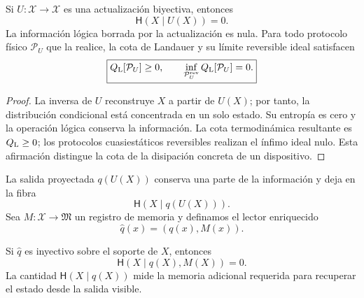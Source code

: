 \begin{theorem}
\label{thm:rm-obs-zero-landauer}
Si \(U:\mathcal X\to\mathcal X\) es una actualizaci\'on biyectiva, entonces
\begin{equation}
 \boxed{\mathsf H(X\mid U(X))=0.}
 \label{eq:rm-obs-zero-conditional-entropy}
\end{equation}
La informaci\'on l\'ogica borrada por la actualizaci\'on es nula. Para todo
protocolo f\'isico \(\mathcal P_U\) que la realice, la cota de Landauer y su
l\'imite reversible ideal satisfacen
\begin{equation}
 \boxed{
 Q_{\rm L}[\mathcal P_U]\geq0,
 \qquad
 \inf_{\mathcal P_U^{\rm rev}}Q_{\rm L}[\mathcal P_U]=0.}
 \label{eq:rm-obs-zero-landauer-cost}
\end{equation}
\end{theorem}

\begin{proof}
La inversa de \(U\) reconstruye \(X\) a partir de \(U(X)\); por tanto, la
distribuci\'on condicional est\'a concentrada en un solo estado. Su entrop\'ia
es cero y la operaci\'on l\'ogica conserva la informaci\'on. La cota
termodin\'amica resultante es \(Q_{\rm L}\geq0\); los protocolos
cuasiest\'aticos reversibles realizan el \'infimo ideal nulo. Esta afirmaci\'on
distingue la cota de la disipaci\'on concreta de un dispositivo.
\end{proof}

La salida proyectada \(q(U(X))\) conserva una parte de la informaci\'on y
deja en la fibra
\begin{equation}
 \mathsf H(X\mid q(U(X))).
 \label{eq:rm-obs-reader-forgotten-info}
\end{equation}
Sea \(M:\mathcal X\to\mathfrak M\) un registro de memoria y definamos el
lector enriquecido
\begin{equation}
 \widehat q(x)=(q(x),M(x)).
 \label{eq:rm-obs-enriched-reader}
\end{equation}

\begin{proposition}
\label{prop:rm-obs-recoverability}
Si \(\widehat q\) es inyectivo sobre el soporte de \(X\), entonces
\begin{equation}
 \boxed{\mathsf H(X\mid q(X),M(X))=0.}
 \label{eq:rm-obs-recoverability}
\end{equation}
La cantidad \(\mathsf H(X\mid q(X))\) mide la memoria adicional requerida
para recuperar el estado desde la salida visible.
\end{proposition}

